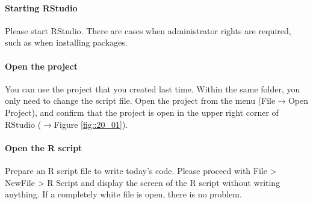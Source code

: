 \documentclass{ltjbook}
\begin{document}
\paragraph{Starting RStudio} Please start RStudio. There are cases when administrator rights are required, such as when installing packages.
\paragraph{Open the project} You can use the project that you created last time. Within the same folder, you only need to change the script file. Open the project from the menu (File$\to$Open Project), and confirm that the project is open in the upper right corner of RStudio ($\to$Figure \ref{fig::20_01}).
\paragraph{Open the R script} Prepare an R script file to write today's code. Please proceed with File > NewFile > R Script and display the screen of the R script without writing anything. If a completely white file is open, there is no problem.
\end{document}
